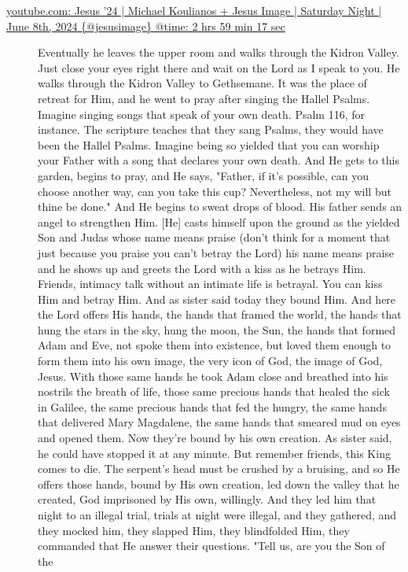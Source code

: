 \documentclass[11pt]{article}
\begin{document}
\begin{description}
\item[{\href{https://youtube.com/watch?v=mLSCu4pKmu4\&t=10757}{youtube.com: Jesus '24 | Michael Koulianos + Jesus Image | Saturday Night | June 8th, 2024 \{@jesusimage\} @time: 2 hrs 59 min 17 sec}}] Eventually he leaves the upper room and
walks through the Kidron
Valley. Just close your eyes right there
and wait on the Lord as I speak to
you. He walks through the Kidron Valley
to Gethsemane. It was the place of retreat for
Him, and he went to
pray after singing the Hallel
Psalms. Imagine singing songs that speak
of your own death. Psalm 116, for instance. The
scripture teaches that they sang Psalms,
they would have been the Hallel
Psalms. Imagine being so yielded that you
can worship your Father with a
song that declares your own death.
And He gets to this
garden, begins to
pray, and He says,
"Father, if it's possible, can you
choose another way, can you take this
cup? Nevertheless, not my will but
thine be done." And He begins to sweat drops of
blood. His father sends an angel to
strengthen Him. [He] casts himself upon the
ground as the yielded Son and
Judas whose name means praise
(don't think for a moment that just
because you praise you can't betray the Lord) his name means praise and
he shows up and greets the Lord with a
kiss as he betrays Him.
Friends, intimacy talk without an intimate life is
betrayal. You can kiss Him and betray Him.
And as sister said
today they bound Him. And here the Lord
offers His hands, the hands that framed
the world, the hands that hung the stars in
the sky, hung the moon, the
Sun, the hands that formed Adam and Eve,
not spoke them into existence, but loved
them enough to form them into his own
image, the very icon of God, the image of
God, Jesus. With those same hands he took Adam
close and breathed into his nostrils the
breath of life, those same precious hands that
healed the sick in Galilee, the same precious hands that fed
the hungry, the same hands that delivered
Mary Magdalene, the same hands that smeared
mud on eyes and opened them. Now they're
bound by his own creation. As sister said, he could have
stopped it at any minute. But remember friends, this King
comes to die. The serpent's head must be crushed
by a bruising, and so He offers those
hands, bound by His own creation, led
down the valley that he created, God
imprisoned by His own,
willingly. And they led him that night to
an illegal trial, trials at night were
illegal, and they
gathered, and they mocked him,
they slapped Him, they blindfolded
Him, they commanded that He answer their
questions. "Tell us, are you the Son of the

\end{description}
\end{document}
